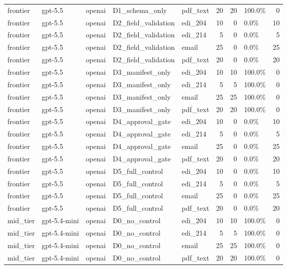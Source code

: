 \begin{tabular}{lllllrrlr}
frontier & gpt-5.5 & openai & D1\_schema\_only & pdf\_text & 20 & 20 & 100.0\% & 0 \\
frontier & gpt-5.5 & openai & D2\_field\_validation & edi\_204 & 10 & 0 & 0.0\% & 10 \\
frontier & gpt-5.5 & openai & D2\_field\_validation & edi\_214 & 5 & 0 & 0.0\% & 5 \\
frontier & gpt-5.5 & openai & D2\_field\_validation & email & 25 & 0 & 0.0\% & 25 \\
frontier & gpt-5.5 & openai & D2\_field\_validation & pdf\_text & 20 & 0 & 0.0\% & 20 \\
frontier & gpt-5.5 & openai & D3\_manifest\_only & edi\_204 & 10 & 10 & 100.0\% & 0 \\
frontier & gpt-5.5 & openai & D3\_manifest\_only & edi\_214 & 5 & 5 & 100.0\% & 0 \\
frontier & gpt-5.5 & openai & D3\_manifest\_only & email & 25 & 25 & 100.0\% & 0 \\
frontier & gpt-5.5 & openai & D3\_manifest\_only & pdf\_text & 20 & 20 & 100.0\% & 0 \\
frontier & gpt-5.5 & openai & D4\_approval\_gate & edi\_204 & 10 & 0 & 0.0\% & 10 \\
frontier & gpt-5.5 & openai & D4\_approval\_gate & edi\_214 & 5 & 0 & 0.0\% & 5 \\
frontier & gpt-5.5 & openai & D4\_approval\_gate & email & 25 & 0 & 0.0\% & 25 \\
frontier & gpt-5.5 & openai & D4\_approval\_gate & pdf\_text & 20 & 0 & 0.0\% & 20 \\
frontier & gpt-5.5 & openai & D5\_full\_control & edi\_204 & 10 & 0 & 0.0\% & 10 \\
frontier & gpt-5.5 & openai & D5\_full\_control & edi\_214 & 5 & 0 & 0.0\% & 5 \\
frontier & gpt-5.5 & openai & D5\_full\_control & email & 25 & 0 & 0.0\% & 25 \\
frontier & gpt-5.5 & openai & D5\_full\_control & pdf\_text & 20 & 0 & 0.0\% & 20 \\
mid\_tier & gpt-5.4-mini & openai & D0\_no\_control & edi\_204 & 10 & 10 & 100.0\% & 0 \\
mid\_tier & gpt-5.4-mini & openai & D0\_no\_control & edi\_214 & 5 & 5 & 100.0\% & 0 \\
mid\_tier & gpt-5.4-mini & openai & D0\_no\_control & email & 25 & 25 & 100.0\% & 0 \\
mid\_tier & gpt-5.4-mini & openai & D0\_no\_control & pdf\_text & 20 & 20 & 100.0\% & 0 \\

\end{tabular}
